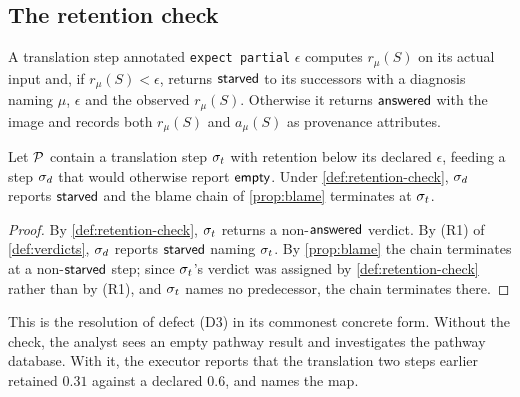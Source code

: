 \subsection{The retention check}

\begin{definition}
\label{def:retention-check}
A translation step annotated \texttt{expect partial} $\epsilon$ computes
$r_\mu(S)$ on its actual input and, if $r_\mu(S) < \epsilon$, returns
$\textsf{starved}$ to its successors with a diagnosis naming $\mu$, $\epsilon$ and the
observed $r_\mu(S)$. Otherwise it returns $\textsf{answered}$ with the image and records
both $r_\mu(S)$ and $a_\mu(S)$ as provenance attributes.
\end{definition}

\begin{proposition}
\label{prop:check-locates}
Let $\mathcal{P}$ contain a translation step $\sigma_t$ with retention below its
declared $\epsilon$, feeding a step $\sigma_d$ that would otherwise report
$\textsf{empty}$. Under \cref{def:retention-check}, $\sigma_d$ reports $\textsf{starved}$ and
the blame chain of \cref{prop:blame} terminates at $\sigma_t$.
\end{proposition}

\begin{proof}
By \cref{def:retention-check}, $\sigma_t$ returns a non-$\textsf{answered}$ verdict. By (R1)
of \cref{def:verdicts}, $\sigma_d$ reports $\textsf{starved}$ naming $\sigma_t$. By
\cref{prop:blame} the chain terminates at a non-$\textsf{starved}$ step; since
$\sigma_t$'s verdict was assigned by \cref{def:retention-check} rather than by
(R1), and $\sigma_t$ names no predecessor, the chain terminates there.
\end{proof}

This is the resolution of defect (D3) in its commonest concrete form. Without
the check, the analyst sees an empty pathway result and investigates the
pathway database. With it, the executor reports that the translation two steps
earlier retained $0.31$ against a declared $0.6$, and names the map.
